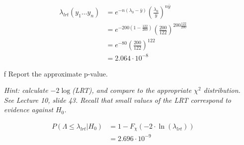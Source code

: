 \documentclass{article}
\newcommand{\1}{\mathbf{1}}
\begin{document}
\begin{itemize}
    \begin{align*}
        \lambda_{lrt}(y_1\hdots y_n) &= e^{-n(\lambda_0 - \bar y)} \left(\frac{\lambda_0}{\bar y}\right)^{n\bar y} \\
        &= e^{-200(1 - \frac{122}{200}) }\left(\frac{200}{122}\right)^{200\frac{122}{200}} \\
        &= e^{-80}\left(\frac{200}{122}\right)^{122} \\
        &= 2.064\cdot 10^{-8}
    \end{align*}

    \item[f] Report the approximate p-value.\par
    {\it Hint: calculate $-2\log$(LRT), and compare to the appropriate $\chi^2$ distribution. See Lecture 10, slide 43. Recall that small values of the LRT correspond to evidence against $H_0$.}
    
    \begin{align*}
        P(\Lambda \leq \lambda_{lrt} | H_0) &= 1 - F_{\chi} (-2 \cdot \ln(\lambda_{lrt}) )\\
        &= 2.696\cdot 10^{-9}
    \end{align*} 
    
\end{itemize}


\newpage
\end{document}
